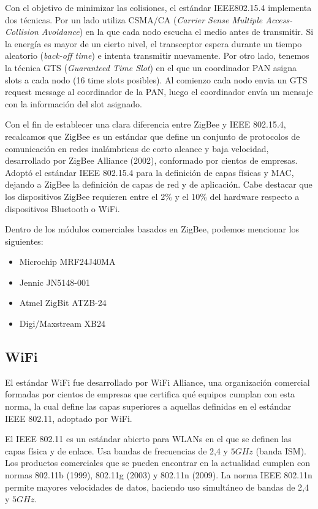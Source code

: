 \documentclass[conference,a4paper,9pt]{IEEEtran}
\begin{document}
Con el objetivo de minimizar las colisiones, el estándar IEEE802.15.4 implementa dos técnicas. Por un lado utiliza CSMA/CA (\textit{Carrier Sense Multiple Access-Collision Avoidance}) en la que cada nodo escucha el medio antes de transmitir. Si la energía es mayor de un cierto nivel, el transceptor espera durante un tiempo aleatorio (\textit{back-off time}) e intenta transmitir nuevamente. Por otro lado, tenemos la técnica GTS (\textit{Guaranteed Time Slot}) en el que un coordinador PAN asigna slots a cada nodo (16 time slots posibles). Al comienzo cada nodo envia un GTS request message al coordinador de la PAN, luego el coordinador envía un mensaje con la información del slot asignado.

Con el fin de establecer una clara diferencia entre ZigBee y IEEE 802.15.4, recalcamos que ZigBee es un estándar que define un conjunto de protocolos de comunicación en redes inalámbricas de corto alcance y baja velocidad, desarrollado por ZigBee Alliance (2002), conformado por cientos de empresas. Adoptó el estándar IEEE 802.15.4 para la definición de capas físicas y MAC, dejando a ZigBee la definición de capas de red y de aplicación. Cabe destacar que los dispositivos ZigBee requieren entre el 2\% y el 10\% del hardware respecto a dispositivos Bluetooth o WiFi.

Dentro de los módulos comerciales basados en ZigBee, podemos mencionar los siguientes:

\begin{itemize}
	\item Microchip MRF24J40MA
	\item Jennic JN5148-001
	\item Atmel ZigBit ATZB-24
	\item Digi/Maxstream XB24 \cite{zigbee}
\end{itemize}

\subsection{WiFi}

El estándar WiFi fue desarrollado por WiFi Alliance, una organización comercial formadas por cientos de empresas que certifica qué equipos cumplan con esta norma, la cual define las capas superiores a aquellas definidas en el estándar IEEE 802.11, adoptado por WiFi.

El IEEE 802.11 es un estándar abierto para WLANs en el que se definen las capas física y de enlace. Usa bandas de frecuencias de 2,4 y $5 GHz$ (banda ISM). Los productos comerciales que se pueden encontrar en la actualidad cumplen con normas 802.11b (1999), 802.11g (2003) y 802.11n (2009). La norma IEEE 802.11n permite mayores velocidades de datos, haciendo uso simultáneo de bandas de 2,4 y $5 GHz$.
\end{document}
